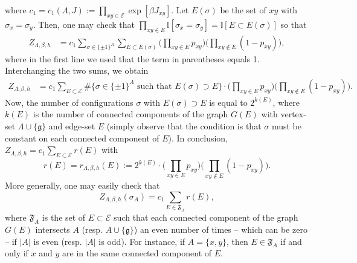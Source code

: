 \documentclass[a4paper,oneside,11pt]{article}
\newcommand{\ee}{\end{equation}}
\newcommand{\be}{\begin{equation}}
\begin{document}
where $c_1=c_1(\Lambda,J):=\prod_{xy\in \mathcal E}\exp[\beta J_{xy}]$. Let $E(\sigma)$ be the set of $xy$ with $\sigma_x=\sigma_y$. Then, one may check that $\prod_{xy\in E}\mathbb I[\sigma_x=\sigma_y]=\mathbb I[E\subset E(\sigma)]$ so that%
 \begin{align*}
Z_{\Lambda,\beta,h}%
&=c_1\sum_{\sigma\in\{\pm 1\}^{\Lambda}}\sum_{E\subset E(\sigma)} \Big(\prod_{xy\in E}p_{xy}\Big)\Big(\prod_{xy\notin E}(1-p_{xy})\Big)
\nonumber,\end{align*}
where in the first line we used that the term in parentheses equals 1. Interchanging the two sums, we obtain
\begin{align*}
Z_{\Lambda,\beta,h}&=c_1\sum_{E\subset \mathcal E} \#\{\sigma\in\{\pm 1\}^{\Lambda}\text{ such that }E(\sigma)\supset E\}\cdot \Big(\prod_{xy\in E}p_{xy}\Big)\Big(\prod_{xy\notin E}(1-p_{xy})\Big).
\end{align*}
Now, the number of configurations $\sigma$ with $E(\sigma)\supset E$ is equal to $2^{k(E)}$, where $k(E)$ is the number of connected components of the graph $G(E)$ with vertex-set $\Lambda\cup\{\mathfrak g\}$ and edge-set $E$ (simply observe that the condition is that $\sigma$ must be constant on each connected component of $E$).
In conclusion,
$
Z_{\Lambda,\beta,h}=c_1 \sum_{E\subset \mathcal E} r(E)
$
with 
\be\nonumber
r(E)=r_{\Lambda,\beta,h}(E):=2^{k(E)}\cdot \Big(\prod_{xy\in E}p_{xy}\Big)\Big(\prod_{xy\notin E}(1-p_{xy})\Big).
\ee
More generally, one may easily check that 
\be\nonumber
Z_{\Lambda,\beta,h}(\sigma_A)=c_1 \sum_{E\in \mathfrak F_A} r(E),
\ee
where $\mathfrak F_A$ is the set of $E\subset\mathcal E$ such that each connected component of the graph $G(E)$ intersects $A$ (resp. $A\cup\{\mathfrak g\}$) an even number of times -- which can be zero -- if $|A|$ is even (resp. $|A|$ is odd). For instance, if $A=\{x,y\}$, then $E\in\mathfrak F_A$ if and only if $x$ and $y$ are in the same connected component of $E$.
\end{document}
